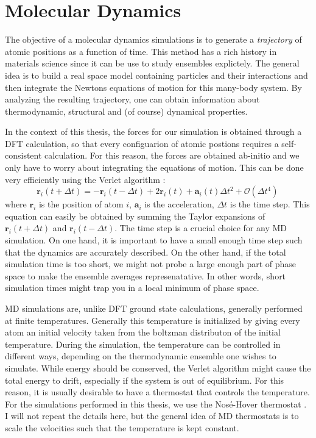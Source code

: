 \section{Molecular Dynamics}\label{sec:method_md}
The objective of a molecular dynamics simulations is to generate a \emph{trajectory} of atomic positions as a function of time. This method has a rich history in materials science since it can be use to study ensembles explictely. The general idea is to build a real space model containing particles and their interactions and then integrate the Newtons equations of motion for this many-body system. By analyzing the resulting trajectory, one can obtain information about thermodynamic, structural and (of course) dynamical properties.

In the context of this thesis, the forces for our simulation is obtained through a DFT calculation, so that every configuarion of atomic postions requires a self-consistent calculation. For this reason, the forces are obtained ab-initio and we only have to worry about integrating the equations of motion. This can be done very efficiently using the Verlet algorithm \cite{Verlet1967}:
%
\[ \bm{r}_i(t+\Delta t) = - \bm{r}_i(t-\Delta t) + 2 \bm{r}_i(t) + \bm{a}_i (t) \Delta t^2 + \mathcal{O}(\Delta t^4) \, \]
%
where $\bm{r}_i$ is the position of atom $i$, $\bm{a}_i$ is the acceleration, $\Delta t$ is the time step. This equation can easily be obtained by summing the Taylor expansions of $\bm{r}_i(t+\Delta t)$ and $\bm{r}_i(t-\Delta t)$. The time step is a crucial choice for any MD simulation. On one hand, it is important to have a small enough time step such that the dynamics are accurately described. On the other hand, if the total simulation time is too short, we might not probe a large enough part of phase space to make the ensemble averages represenatative. In other words, short simulation times might trap you in a local minimum of phase space.

MD simulations are, unlike DFT ground state calculations, generally performed at finite temperatures. Generally this temperature is initialized by giving every atom an initial velocity taken from the boltzman distributon of the initial temperature. During the simulation, the temperature can be controlled in different ways, depending on the thermodynamic ensemble one wishes to simulate. While energy should be conserved, the Verlet algorithm might cause the total energy to drift, especially if the system is out of equilibrium. For this reason, it is usually desirable to have a thermostat that controls the temperature. For the simulations performed in this thesis, we use the Nos\'e-Hover thermostat \cite{Nose1984}. I will not repeat the details here, but the general idea of MD thermostats is to scale the velocities such that the temperature is kept constant.


